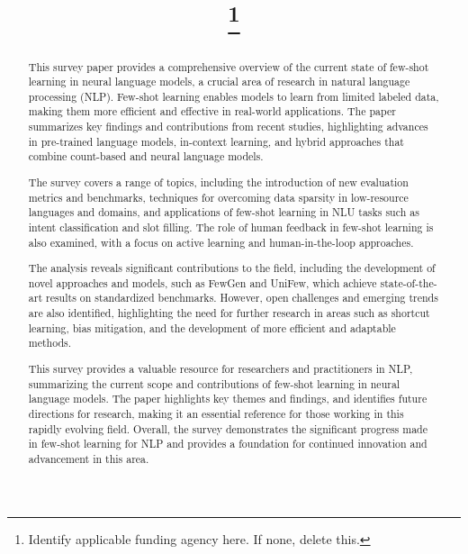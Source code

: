 \documentclass[conference]{IEEEtran}
\begin{document}
\title{
\thanks{Identify applicable funding agency here. If none, delete this.}
}

\author{
\and
{}
}

\maketitle

\begin{abstract}
This survey paper provides a comprehensive overview of the current state of few-shot learning in neural language models, a crucial area of research in natural language processing (NLP). Few-shot learning enables models to learn from limited labeled data, making them more efficient and effective in real-world applications. The paper summarizes key findings and contributions from recent studies, highlighting advances in pre-trained language models, in-context learning, and hybrid approaches that combine count-based and neural language models.

The survey covers a range of topics, including the introduction of new evaluation metrics and benchmarks, techniques for overcoming data sparsity in low-resource languages and domains, and applications of few-shot learning in NLU tasks such as intent classification and slot filling. The role of human feedback in few-shot learning is also examined, with a focus on active learning and human-in-the-loop approaches.

The analysis reveals significant contributions to the field, including the development of novel approaches and models, such as FewGen and UniFew, which achieve state-of-the-art results on standardized benchmarks. However, open challenges and emerging trends are also identified, highlighting the need for further research in areas such as shortcut learning, bias mitigation, and the development of more efficient and adaptable methods.

This survey provides a valuable resource for researchers and practitioners in NLP, summarizing the current scope and contributions of few-shot learning in neural language models. The paper highlights key themes and findings, and identifies future directions for research, making it an essential reference for those working in this rapidly evolving field. Overall, the survey demonstrates the significant progress made in few-shot learning for NLP and provides a foundation for continued innovation and advancement in this area.
\end{abstract}
\end{document}
